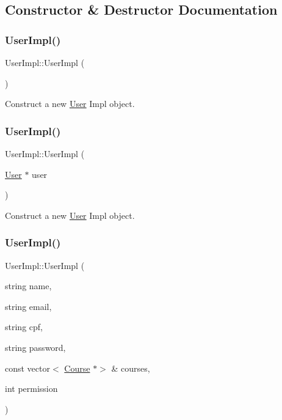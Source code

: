 \subsection{Constructor \& Destructor Documentation}
\mbox{\label{classUserImpl_a247633b3d3fb9449719bd9c12873b4cb}} 
\subsubsection{\texorpdfstring{User\+Impl()}{UserImpl()}\hspace{0.1cm}{\footnotesize\ttfamily [1/3]}}
{\footnotesize\ttfamily User\+Impl\+::\+User\+Impl (\begin{DoxyParamCaption}{ }\end{DoxyParamCaption})}



Construct a new \hyperlink{classUser}{User} Impl object. 

\mbox{\label{classUserImpl_a5c9de4c05578de165fe9c7b8d2138831}} 
\subsubsection{\texorpdfstring{User\+Impl()}{UserImpl()}\hspace{0.1cm}{\footnotesize\ttfamily [2/3]}}
{\footnotesize\ttfamily User\+Impl\+::\+User\+Impl (\begin{DoxyParamCaption}\item[{\hyperlink{classUser}{User} $\ast$}]{user }\end{DoxyParamCaption})}



Construct a new \hyperlink{classUser}{User} Impl object. 

\mbox{\label{classUserImpl_a54977619bd2174542f04de58ec932fb5}} 
\subsubsection{\texorpdfstring{User\+Impl()}{UserImpl()}\hspace{0.1cm}{\footnotesize\ttfamily [3/3]}}
{\footnotesize\ttfamily User\+Impl\+::\+User\+Impl (\begin{DoxyParamCaption}\item[{string}]{name,  }\item[{string}]{email,  }\item[{string}]{cpf,  }\item[{string}]{password,  }\item[{const vector$<$ \hyperlink{classCourse}{Course} $\ast$$>$ \&}]{courses,  }\item[{int}]{permission }\end{DoxyParamCaption})}



